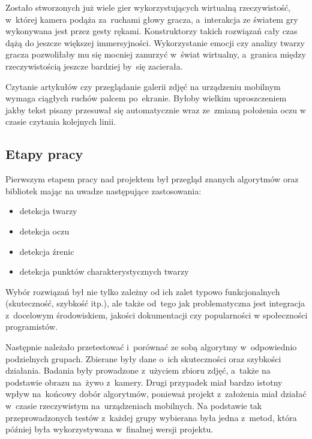 \par

Zostało stworzonych już wiele gier wykorzystujących wirtualną rzeczywistość, w~której kamera podąża za~ruchami głowy gracza, a~interakcja ze światem gry wykonywana jest przez gesty rękami. Konstruktorzy takich rozwiązań cały czas dążą do jeszcze większej immersyjności. Wykorzystanie emocji czy analizy twarzy gracza pozwoliłaby mu się mocniej zanurzyć w~świat wirtualny, a~granica między rzeczywistością jeszcze bardziej by~się zacierała. 

\par

Czytanie artykułów czy przeglądanie galerii zdjęć na urządzeniu mobilnym wymaga ciągłych ruchów palcem po~ekranie. Byłoby wielkim uproszczeniem jakby tekst pisany przesuwał się automatycznie wraz ze~zmianą położenia oczu w czasie czytania kolejnych linii. 


\subsection{Etapy pracy}

Pierwszym etapem pracy nad projektem był przegląd znanych algorytmów oraz bibliotek mając na uwadze następujące zastosowania:

\begin{itemize}
    \item detekcja twarzy
    \item detekcja oczu
    \item detekcja źrenic
    \item detekcja punktów charakterystycznych twarzy
\end{itemize}

Wybór rozwiązań był nie tylko zależny od ich zalet typowo funkcjonalnych (skuteczność, szybkość itp.), ale także od~tego jak problematyczna jest integracja z~docelowym środowiskiem, jakości dokumentacji czy popularności w społeczności programistów.

\par

Następnie należało przetestować i~porównać ze sobą algorytmy w~odpowiednio podzielnych grupach. Zbierane były dane o~ich skuteczności oraz szybkości działania. Badania były prowadzone z~użyciem zbioru zdjęć, a~także na podstawie obrazu na~żywo z~kamery. Drugi przypadek miał bardzo istotny wpływ na~końcowy dobór algorytmów, ponieważ projekt z~założenia miał działać w~czasie rzeczywistym na~urządzeniach mobilnych. Na podstawie tak przeprowadzonych testów z~każdej grupy wybierana była jedna z~metod, która później była wykorzystywana w~finalnej wersji projektu.

